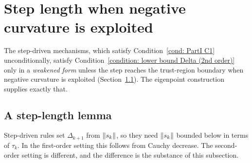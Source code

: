 \documentclass[11pt]{article}
\theoremstyle{plain}
\theoremstyle{definition}
\theoremstyle{remark}
\numberwithin{equation}{section}
\begin{document}
\section{Step length when negative curvature is exploited}

The step-driven mechanisms, which satisfy Condition~\ref{cond: PartI C1} unconditionally, satisfy
Condition~\ref{condition: lower bound Delta (2nd order)} only in a \emph{weakened form} unless the
step reaches the trust-region boundary when negative curvature is exploited
(Section~\ref{subsec:so step length}). The eigenpoint construction supplies exactly that.

\subsection{A step-length lemma}
\label{subsec:so step length}

Step-driven rules set $\Delta_{k+1}$ from $\left \lVert s_k \right \rVert$, so they need $\left \lVert s_k \right \rVert$ bounded below in
terms of $\tau_k$. In the first-order setting this follows from Cauchy decrease. The second-order
setting is different, and the difference is the substance of this subsection.
\end{document}
